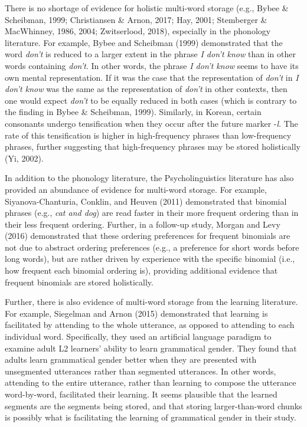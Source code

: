 \documentclass[
  man,floatsintext]{apa6}
\begin{document}
There is no shortage of evidence for holistic multi-word storage (e.g., Bybee \& Scheibman, 1999; Christiansen \& Arnon, 2017; Hay, 2001; Stemberger \& MacWhinney, 1986, 2004; Zwitserlood, 2018), especially in the phonology literature. For example, Bybee and Scheibman (1999) demonstrated that the word \emph{don't} is reduced to a larger extent in the phrase \emph{I don't know} than in other words containing \emph{don't}. In other words, the phrase \emph{I don't know} seems to have its own mental representation. If it was the case that the representation of \emph{don't} in \emph{I don't know} was the same as the representation of \emph{don't} in other contexts, then one would expect \emph{don't} to be equally reduced in both cases (which is contrary to the finding in Bybee \& Scheibman, 1999). Similarly, in Korean, certain consonants undergo tensification when they occur after the future marker -\emph{l}. The rate of this tensification is higher in high-frequency phrases than low-frequency phrases, further suggesting that high-frequency phrases may be stored holistically (Yi, 2002).

In addition to the phonology literature, the Psycholinguistics literature has also provided an abundance of evidence for multi-word storage. For example, Siyanova-Chanturia, Conklin, and Heuven (2011) demonstrated that binomial phrases (e.g., \emph{cat and dog}) are read faster in their more frequent ordering than in their less frequent ordering. Further, in a follow-up study, Morgan and Levy (2016) demonstrated that these ordering preferences for frequent binomials are not due to abstract ordering preferences (e.g., a preference for short words before long words), but are rather driven by experience with the specific binomial (i.e., how frequent each binomial ordering is), providing additional evidence that frequent binomials are stored holistically.

Further, there is also evidence of multi-word storage from the learning literature. For example, Siegelman and Arnon (2015) demonstrated that learning is facilitated by attending to the whole utterance, as opposed to attending to each individual word. Specifically, they used an artificial language paradigm to examine adult L2 learners' ability to learn grammatical gender. They found that adults learn grammatical gender better when they are presented with unsegmented utterances rather than segmented utterances. In other words, attending to the entire utterance, rather than learning to compose the utterance word-by-word, facilitated their learning. It seems plausible that the learned segments are the segments being stored, and that storing larger-than-word chunks is possibly what is facilitating the learning of grammatical gender in their study.
\end{document}
